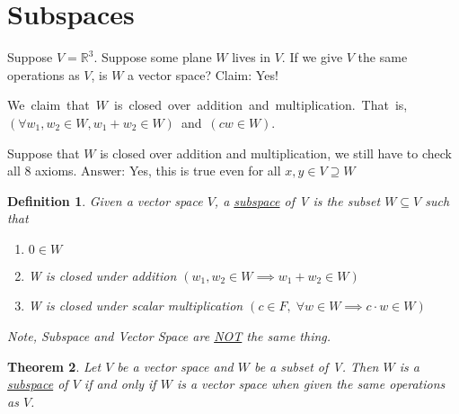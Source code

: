 \documentclass{article}
\newtheorem{theorem}{Theorem}[section]
\newtheorem{definition}[theorem]{Definition}
\newtheorem{one minute paper}[theorem]{One Minute Paper}
\begin{document}
\section*{Subspaces}

Suppose $V = \mathbb{R}^3$. Suppose some plane $W$ lives in $V$. If we give $V$ the same operations as $V$, is $W$ a vector space? Claim: Yes!

\hbox{We claim that $W$ is closed over addition and multiplication. That is, $(\forall w_1, w_2 \in W, w_1 + w_2 \in W)$ and $(cw \in W)$.}

Suppose that $W$ is closed over addition and multiplication, we still have to check all 8 axioms. Answer: Yes, this is true even for all $x,y \in V \supseteq W$

\begin{definition}
    Given a vector space $V$, a \underline{subspace} of V is the subset $W \subseteq V$ such that 
    \begin{enumerate}
        \item $0 \in W$
        \item W is closed under addition $(w_1, w_2 \in W \implies w_1 + w_2 \in W)$
        \item W is closed under scalar multiplication $(c \in F, \; \forall w \in W \implies c \cdot w \in W)$
    \end{enumerate}
    Note, Subspace and Vector Space are \underline{NOT} the same thing. 
\end{definition}

\begin{theorem}
    Let $V$ be a vector space and $W$ be a subset of V. Then $W$ is a \underline{subspace} of $V$ if and only if
    $W$ is a vector space when given the same operations as $V$. 
\end{theorem}
\end{document}
